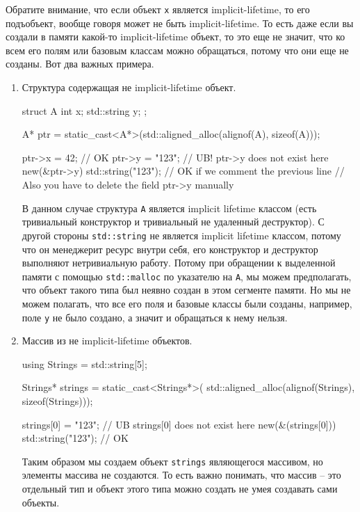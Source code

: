 \documentclass{article}
\begin{document}
Обратите внимание, что если объект \verb"x" является implicit-lifetime, то его подъобъект, вообще говоря может не быть implicit-lifetime.
То есть даже если вы создали в памяти какой-то  implicit-lifetime объект, то это еще не значит, что ко всем его полям или базовым классам можно обращаться, потому что они еще не созданы.
Вот два важных примера.
\begin{enumerate}
\item Структура содержащая не implicit-lifetime объект.
\begin{cppcode}
struct A {
  int x;
  std::string y;
};

A* ptr = static_cast<A*>(std::aligned_alloc(alignof(A), sizeof(A)));

ptr->x = 42;                     // OK
ptr->y = "123";                  // UB! ptr->y does not exist here
new(&ptr->y) std::string("123"); // OK if we comment the previous line
                                 // Also you have to delete the field ptr->y manually
\end{cppcode}
В данном случае структура \verb"A" является implicit lifetime классом (есть тривиальный конструктор и тривиальный не удаленный деструктор).
С другой стороны \verb"std::string" не является implicit lifetime классом, потому что он менеджерит ресурс внутри себя, его конструктор и деструктор выполняют нетривиальную работу.
Потому при обращении к выделенной памяти с помощью \verb"std::malloc" по указателю на \verb"A", мы можем предполагать, что объект такого типа был неявно создан в этом сегменте памяти.
Но мы не можем полагать, что все его поля и базовые классы были созданы, например, поле \verb"y" не было создано, а значит и обращаться к нему нельзя.

\item Массив из не implicit-lifetime объектов.
\begin{cppcode}
using Strings = std::string[5];

Strings* strings = static_cast<Strings*>(
                       std::aligned_alloc(alignof(Strings), sizeof(Strings)));

strings[0] = "123"; // UB strings[0] does not exist here
new(&(strings[0])) std::string("123"); // OK
\end{cppcode}
Таким образом мы создаем объект \verb"strings" являющегося массивом, но элементы массива не создаются.
То есть важно понимать, что массив -- это отдельный тип и объект этого типа можно создать не умея создавать сами объекты.
\end{enumerate}
\end{document}
